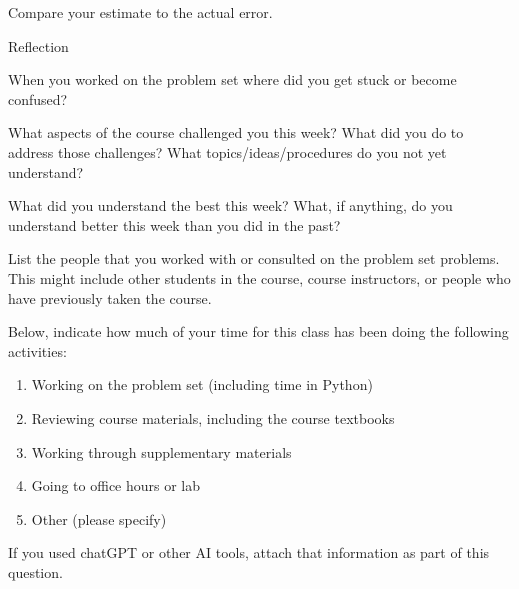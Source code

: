 \documentclass[12pt,letterpaper,noanswers]{exam}
\begin{document}
\begin{questions}
\begin{parts}
\item Compare your estimate to the actual error.

\end{parts}

\question Reflection
\begin{parts}
\item When you worked on the problem set where did you get stuck or become confused?
\item What aspects of the course challenged you this week?  What did you do to address those challenges?  What topics/ideas/procedures do you not yet understand?
\item What did you understand the best this week?  What, if anything, do you understand better this week than you did in the past?
\item List the people that you worked with or consulted on the problem set problems.  This might include other students in the course, course instructors, or people who have previously taken the course.
\item Below, indicate how much of your time for this class has been doing the following activities:
	\begin{enumerate}
	\item Working on the problem set (including time in Python)
	\item Reviewing course materials, including the course textbooks
	\item Working through supplementary materials
	\item Going to office hours or lab
	\item Other (please specify)
	\end{enumerate}
\item If you used chatGPT or other AI tools, attach that information as part of this question.
\end{parts}

\end{questions}
\end{document}
